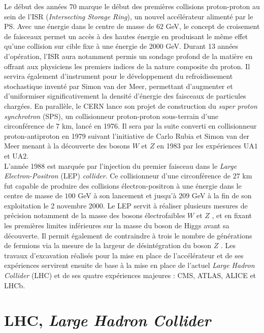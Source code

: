 Le début des années 70 marque le début des premières collisions proton-proton au sein de l'ISR (\textit{Intersecting Storage Ring}), un nouvel accélérateur alimenté par le PS. Avec une énergie dans le centre de masse de $62$ GeV, le concept de croisement de faisceaux permet un accès à des hautes énergie en produisant le même effet qu'une collision sur cible fixe à une énergie de $2000$ GeV. Durant 13 années d'opération, l'ISR aura notamment permis un sondage profond de la matière en offrant aux physiciens les premiers indices de la nature composite du proton. Il servira également d'instrument pour le développement du refroidissement stochastique inventé par Simon van der Meer, permettant d'augmenter et d'uniformiser significativement la densité d'énergie des faisceaux de particules chargées. En parallèle, le CERN lance son projet de construction du \textit{super proton synchrotron} (SPS), un collisionneur proton-proton sous-terrain d'une circonférence de $7$ km, lancé en 1976. Il sera par la suite converti en collisionneur proton-antiproton en 1979 suivant l'initiative de Carlo Rubia et Simon van der Meer menant à la découverte des bosons $W$ et $Z$ en 1983 par les expériences UA$1$ et UA$2$. \\

L'année 1988 est marquée par l'injection du premier faisceau dans le \textit{Large Electron-Positron} (LEP) \textit{collider}. Ce collisionneur d'une circonférence de $27$ km fut capable de produire des collisions électron-positron à une énergie dans le centre de masse de $100$ GeV à son lancement et jusqu'à $209$ GeV à la fin de son exploitation le 2 novembre 2000. Le LEP servit à réaliser plusieurs mesures de précision notamment de la masse des bosons électrofaibles $W$ et $Z$ \cite{Wmass,Zmass}, et en fixant les premières limites inférieures sur la masse du boson de Higgs avant sa découverte. Il permit également de contraindre à trois le nombre de générations de fermions via la mesure de la largeur de désintégration du boson $Z$ \cite{ZALEPH,ZDELPHI,ZL3,ZOPAL}. Les travaux d'excavation réalisés pour la mise en place de l'accélérateur et de ses expériences servirent ensuite de base à la mise en place de l'actuel \textit{Large Hadron Collider} (LHC) et de ses quatre expériences majeures : CMS, ATLAS, ALICE et LHCb. \\

\section{LHC, \textit{\uppercase{L}arge \uppercase{H}adron \uppercase{C}ollider}}

